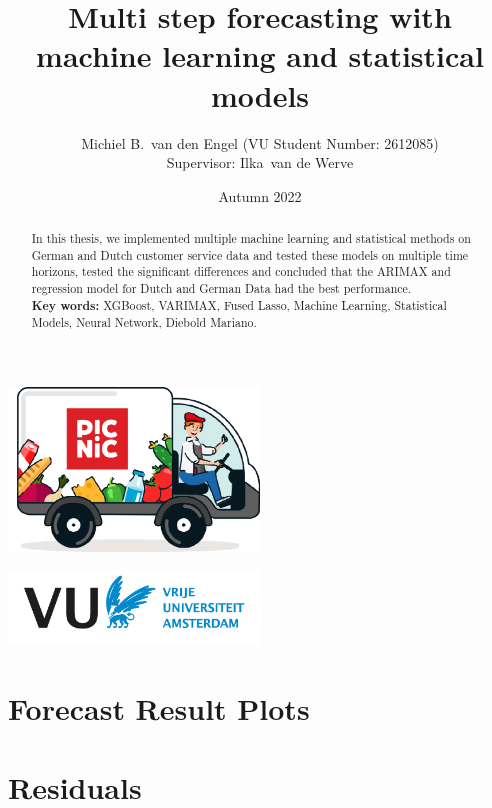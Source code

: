 \documentclass[hidelinks, a4paper,12pt]{article}
\title{Multi step forecasting with machine learning and statistical models}
\author{
    Michiel B.\ van den Engel
    (VU Student Number: 2612085)
    \\[2ex]
    Supervisor: Ilka\ van de Werve\\
    }
\date{Autumn 2022}
\begin{document}
\maketitle

\begin{abstract}
\noindent In this thesis, we implemented multiple machine learning and statistical methods on German and Dutch customer service data and tested these models on multiple time horizons, tested the significant differences and concluded that the ARIMAX and regression model for Dutch and German Data had the best performance.\\[1ex]
\noindent\textbf{Key words: } XGBoost, VARIMAX, Fused Lasso, Machine Learning, Statistical Models, Neural Network, Diebold Mariano. 
\end{abstract}

\vfill
\centerline{\includegraphics[width=0.5\textwidth]{picnic_auto.png}}
\vfill
\centerline{\includegraphics[width=0.5\textwidth]{VU_logo.jpg}}
\clearpage
\tableofcontents
\newpage








\newpage
\appendix

\section{Forecast Result Plots}
\label{sec:forecast results}
%
\section{Residuals}
\label{sec:residuals}


\newpage


\end{document}
